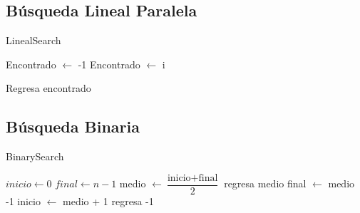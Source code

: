 \documentclass[12pt, fleqn]{article}                             %
\theoremstyle{break}                                            %
\begin{document}
    \subsection{Búsqueda Lineal Paralela}
        \begin{algorithm}[H]
        \caption{LinealSearch}
        \begin{algorithmic}[1]
            Encontrado $\gets$ -1
                        \State Encontrado $\gets$ i
                    \EndIf
                \EndFor
    
            \EndFor
            
            Regresa encontrado
            \EndProcedure
            \end{algorithmic}
        \end{algorithm}
        
    \subsection{Búsqueda Binaria}
        \begin{algorithm}[H]
        \caption{BinarySearch}
        \begin{algorithmic}[1]
            \State $inicio \gets 0$
            \State $final \gets n - 1$
               \State medio $\gets \dfrac{\text{inicio} + \text{final}}{2}$
                    \State regresa medio
                \EndIf
                    \State final $\gets$ medio -1
                \EndIf
                    \State inicio $\gets$ medio + 1
                \EndIf
            \EndWhile
            \State regresa -1
            \EndProcedure
            \end{algorithmic}
        \end{algorithm}
        
\end{document}
